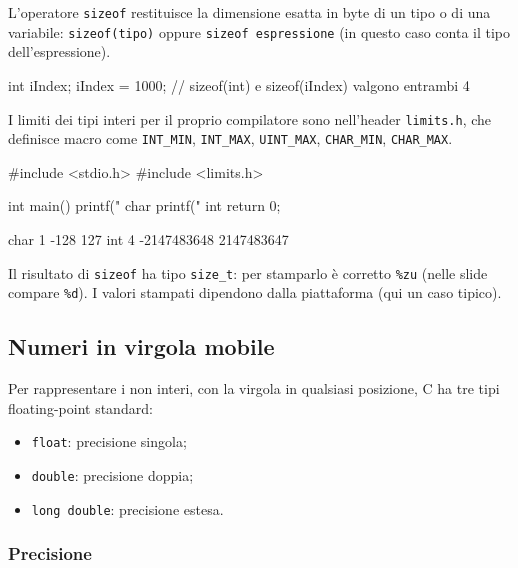\documentclass[11pt,a4paper]{article}
\begin{document}
L'operatore \lstinline|sizeof| restituisce la dimensione esatta in byte di un tipo
o di una variabile: \lstinline|sizeof(tipo)| oppure \lstinline|sizeof espressione|
(in questo caso conta il tipo dell'espressione).

\begin{codice}
int iIndex;
iIndex = 1000;
// sizeof(int) e sizeof(iIndex) valgono entrambi 4
\end{codice}

I limiti dei tipi interi per il proprio compilatore sono nell'header
\lstinline|limits.h|, che definisce macro come \lstinline|INT_MIN|,
\lstinline|INT_MAX|, \lstinline|UINT_MAX|, \lstinline|CHAR_MIN|,
\lstinline|CHAR_MAX|.

\begin{codice}
#include <stdio.h>
#include <limits.h>

int main() {
    printf(" char %
    printf(" int %
    return 0;
}
\end{codice}
\begin{risultato}
 char 1 -128 127
 int 4 -2147483648 2147483647
\end{risultato}

\begin{osservazione}
Il risultato di \lstinline|sizeof| ha tipo \lstinline|size_t|: per stamparlo è
corretto \lstinline|%zu| (nelle slide compare \lstinline|%d|). I valori stampati
dipendono dalla piattaforma (qui un caso tipico).
\end{osservazione}

\subsection{Numeri in virgola mobile}

Per rappresentare i non interi, con la virgola in qualsiasi posizione, C ha tre
tipi floating-point standard:
\begin{itemize}
    \item \lstinline|float|: precisione singola;
    \item \lstinline|double|: precisione doppia;
    \item \lstinline|long double|: precisione estesa.
\end{itemize}

\subsubsection{Precisione}
\end{document}
